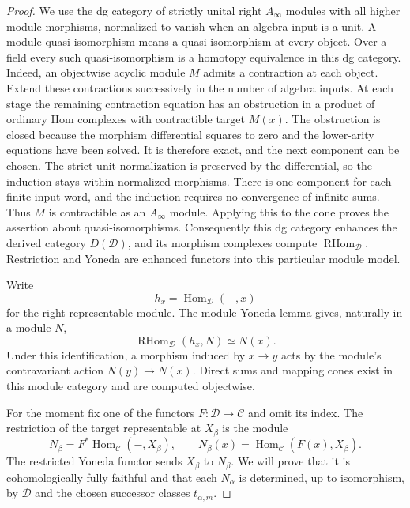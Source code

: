 \documentclass[11pt]{article}
\numberwithin{equation}{section}
\theoremstyle{definition}
\theoremstyle{remark}
\begin{document}
\begin{proof}
We use the dg category of strictly unital right $A_\infty$ modules with
all higher module morphisms, normalized to vanish when an algebra input
is a unit.  A module quasi-isomorphism means a quasi-isomorphism at every
object.  Over a field every such quasi-isomorphism is a homotopy
equivalence in this dg category.  Indeed, an objectwise acyclic module
$M$ admits a contraction at each object.  Extend these contractions
successively in the number of algebra inputs.  At each stage the
remaining contraction equation has an obstruction in a product of
ordinary Hom complexes with contractible target $M(x)$.  The obstruction
is closed because the morphism differential squares to zero and the
lower-arity equations have been solved.  It is therefore exact, and
the next component can be chosen.  The
strict-unit normalization is preserved by the differential, so the
induction stays within normalized morphisms.  There is one component
for each finite input word, and the induction requires no convergence
of infinite sums.  Thus $M$ is contractible as an $A_\infty$ module.
Applying this to the cone proves the assertion about quasi-isomorphisms.
Consequently this dg category enhances the derived category
$D(\mathcal D)$, and its morphism complexes compute
$\operatorname{RHom}_{\mathcal D}$.  Restriction and Yoneda are enhanced
functors into this particular module model.

Write
\[
 h_x=\operatorname{Hom}_{\mathcal D}(-,x)
\]
for the right representable module.  The module Yoneda lemma gives,
naturally in a module $N$,
\begin{equation}
 \operatorname{RHom}_{\mathcal D}(h_x,N)\simeq N(x).
 \label{eq:ordered-module-yoneda}
\end{equation}
Under this identification, a morphism induced by $x\to y$ acts by the
module's contravariant action $N(y)\to N(x)$.  Direct sums and mapping
cones exist in this module category and are computed objectwise.

For the moment fix one of the functors $F:\mathcal D\to\mathcal C$ and
omit its index.  The restriction of the target representable at
$X_\beta$ is the module
\[
 N_\beta=F^*\operatorname{Hom}_{\mathcal C}(-,X_\beta),
 \qquad
 N_\beta(x)=\operatorname{Hom}_{\mathcal C}(F(x),X_\beta).
\]
The restricted Yoneda functor sends $X_\beta$ to $N_\beta$.  We will prove
that it is cohomologically fully faithful and that each $N_\alpha$ is
determined, up to isomorphism, by $\mathcal D$ and the chosen successor
classes $t_{\alpha,m}$.


\end{proof}
\end{document}
